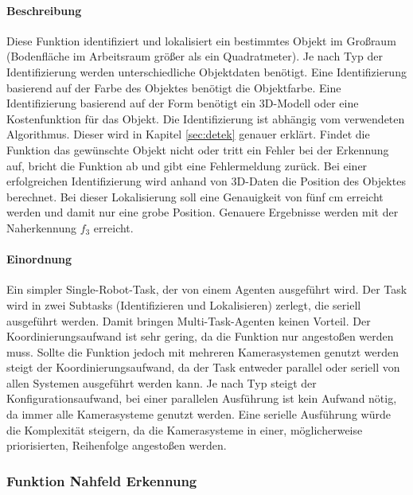 \paragraph{Beschreibung}
Diese Funktion identifiziert und lokalisiert ein bestimmtes Objekt im Großraum (Bodenfläche im Arbeitsraum größer als ein Quadratmeter). Je nach Typ der Identifizierung werden unterschiedliche Objektdaten benötigt. Eine Identifizierung basierend auf der Farbe des Objektes benötigt die Objektfarbe. Eine Identifizierung basierend auf der Form benötigt ein 3D-Modell oder eine Kostenfunktion für das Objekt. Die Identifizierung ist abhängig vom verwendeten Algorithmus. Dieser wird in Kapitel \ref{sec:detek} genauer erklärt. Findet die Funktion das gewünschte Objekt nicht oder tritt ein Fehler bei der Erkennung auf, bricht die Funktion ab und gibt eine Fehlermeldung zurück. Bei einer erfolgreichen Identifizierung wird anhand von 3D-Daten die Position des Objektes berechnet. Bei dieser Lokalisierung soll eine Genauigkeit von fünf cm erreicht werden und damit nur eine grobe Position. Genauere Ergebnisse werden mit der Naherkennung $f_3$ erreicht. 

\paragraph{Einordnung}
Ein simpler Single-Robot-Task, der von einem Agenten ausgeführt wird. Der Task wird in zwei Subtasks (Identifizieren und Lokalisieren) zerlegt, die seriell ausgeführt werden. Damit bringen Multi-Task-Agenten keinen Vorteil. Der Koordinierungsaufwand ist sehr gering, da die Funktion nur angestoßen werden muss. Sollte die Funktion jedoch mit mehreren Kamerasystemen genutzt werden steigt der Koordinierungsaufwand, da der Task entweder parallel oder seriell von allen Systemen ausgeführt werden kann. Je nach Typ steigt der Konfigurationsaufwand, bei einer parallelen Ausführung ist kein Aufwand nötig, da immer alle Kamerasysteme genutzt werden. Eine serielle Ausführung würde die Komplexität steigern, da die Kamerasysteme in einer, möglicherweise priorisierten, Reihenfolge angestoßen werden.

\subsubsection{Funktion Nahfeld Erkennung}
\label{sec:funnah}

